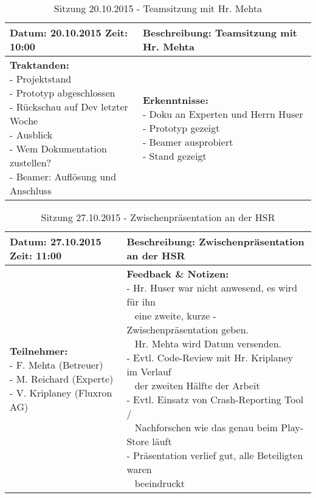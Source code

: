 \begin{table}[H]
\begin{tabularx}{\textwidth}{| l | X |}
\hline
\textbf{Datum:} 20.10.2015
\textbf{Zeit:} 10:00
&
\textbf{Beschreibung:} Teamsitzung mit Hr. Mehta \\ \hline
\specialcell[t]{
\textbf{Traktanden:}\\
- Projektstand\\
- Prototyp abgeschlossen\\
- Rückschau auf Dev letzter Woche\\
- Ausblick\\
- Wem Dokumentation zustellen?\\
- Beamer: Auflösung und Anschluss\\
}
& 
\specialcell[t]{
\textbf{Erkenntnisse:}\\
- Doku an Experten und Herrn Huser\\
- Prototyp gezeigt\\
- Beamer ausprobiert\\
- Stand gezeigt\\
}
\\ \hline
\end{tabularx}
\caption{Sitzung 20.10.2015 - Teamsitzung mit Hr. Mehta}
\end{table}



\begin{table}[H]
\begin{tabularx}{\textwidth}{| l | X |}
\hline
\textbf{Datum:} 27.10.2015
\textbf{Zeit:} 11:00
&
\textbf{Beschreibung:} Zwischenpräsentation an der HSR \\ \hline
\specialcell[t]{
\textbf{Teilnehmer:}\\
- F. Mehta (Betreuer)\\
- M. Reichard (Experte)\\
- V. Kriplaney (Fluxron AG)\\
}
& 
\specialcell[t]{
\textbf{Feedback \& Notizen:}\\
- Hr. Huser war nicht anwesend, es wird für ihn\\~ eine zweite, kurze - Zwischenpräsentation geben.\\~ Hr. Mehta wird Datum versenden.\\
- Evtl. Code-Review mit Hr. Kriplaney im Verlauf\\~ der zweiten Hälfte der Arbeit\\
- Evtl. Einsatz von Crash-Reporting Tool /\\~ Nachforschen wie das genau beim Play-Store läuft\\
- Präsentation verlief gut, alle Beteiligten waren\\~ beeindruckt\\
}
\\ \hline
\end{tabularx}
\caption{Sitzung 27.10.2015 - Zwischenpräsentation an der HSR}
\end{table}



